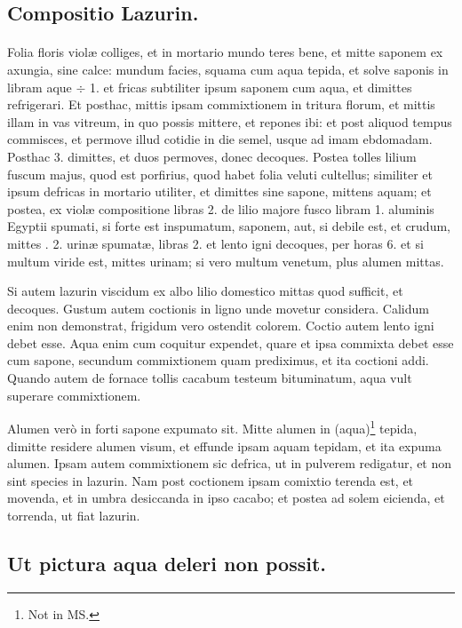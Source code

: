 \documentclass[a4paper, 11pt, oneside, polutonikogreek, italian]{article}
\begin{document}
\subsection{Compositio Lazurin.}
\paragraph{}
Folia floris violæ colliges, et in mortario mundo teres bene, et mitte saponem ex axungia, sine calce: mundum facies, squama cum aqua tepida, et solve saponis in libram aque $\div$ 1. et fricas subtiliter ipsum saponem cum aqua, et dimittes refrigerari. Et posthac, mittis ipsam commixtionem in tritura florum, et mittis illam in vas vitreum, in quo possis mittere, et repones ibi: et post aliquod tempus commisces, et permove illud cotidie in die semel, usque ad imam ebdomadam. Posthac 3. dimittes, et duos permoves, donec decoques. Postea tolles lilium fuscum majus, quod est porfirius, quod habet folia veluti cultellus; similiter et ipsum defricas in mortario utiliter, et dimittes sine sapone, mittens aquam; et postea, ex violæ compositione libras 2. de lilio majore fusco libram 1. aluminis Egyptii spumati, si forte est inspumatum, saponem, aut, si debile est, et crudum, mittes \roundz. 2. urinæ spumatæ, libras 2. et lento igni decoques, per horas 6. et si multum viride est, mittes urinam; si vero multum venetum, plus alumen mittas.

Si autem lazurin viscidum ex albo lilio domestico mittas quod sufficit, et decoques. Gustum autem coctionis in ligno unde movetur considera. Calidum enim non demonstrat, frigidum vero ostendit colorem. Coctio autem lento igni debet esse. Aqua enim cum coquitur expendet, quare et ipsa commixta debet esse cum sapone, secundum commixtionem quam prediximus, et ita coctioni addi. Quando autem de fornace tollis cacabum testeum bituminatum, aqua vult superare commixtionem.

Alumen verò in forti sapone expumato sit. Mitte alumen in (aqua)\footnote{Not in MS.} tepida, dimitte residere alumen visum, et effunde ipsam aquam tepidam, et ita expuma alumen. Ipsam autem commixtionem sic defrica, ut in pulverem redigatur, et non sint species in lazurin. Nam post coctionem ipsam comixtio terenda est, et movenda, et in umbra desiccanda in ipso cacabo; et postea ad solem eicienda, et torrenda, ut fiat lazurin.

\subsection{Ut pictura aqua deleri non possit.}
\end{document}
